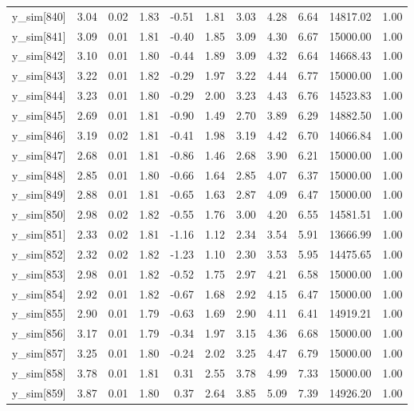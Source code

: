 \begin{table}[ht]
\begin{tabular}{rrrrrrrrrrr}
  y\_sim[840] & 3.04 & 0.02 & 1.83 & -0.51 & 1.81 & 3.03 & 4.28 & 6.64 & 14817.02 & 1.00 \\ 
  y\_sim[841] & 3.09 & 0.01 & 1.81 & -0.40 & 1.85 & 3.09 & 4.30 & 6.67 & 15000.00 & 1.00 \\ 
  y\_sim[842] & 3.10 & 0.01 & 1.80 & -0.44 & 1.89 & 3.09 & 4.32 & 6.64 & 14668.43 & 1.00 \\ 
  y\_sim[843] & 3.22 & 0.01 & 1.82 & -0.29 & 1.97 & 3.22 & 4.44 & 6.77 & 15000.00 & 1.00 \\ 
  y\_sim[844] & 3.23 & 0.01 & 1.80 & -0.29 & 2.00 & 3.23 & 4.43 & 6.76 & 14523.83 & 1.00 \\ 
  y\_sim[845] & 2.69 & 0.01 & 1.81 & -0.90 & 1.49 & 2.70 & 3.89 & 6.29 & 14882.50 & 1.00 \\ 
  y\_sim[846] & 3.19 & 0.02 & 1.81 & -0.41 & 1.98 & 3.19 & 4.42 & 6.70 & 14066.84 & 1.00 \\ 
  y\_sim[847] & 2.68 & 0.01 & 1.81 & -0.86 & 1.46 & 2.68 & 3.90 & 6.21 & 15000.00 & 1.00 \\ 
  y\_sim[848] & 2.85 & 0.01 & 1.80 & -0.66 & 1.64 & 2.85 & 4.07 & 6.37 & 15000.00 & 1.00 \\ 
  y\_sim[849] & 2.88 & 0.01 & 1.81 & -0.65 & 1.63 & 2.87 & 4.09 & 6.47 & 15000.00 & 1.00 \\ 
  y\_sim[850] & 2.98 & 0.02 & 1.82 & -0.55 & 1.76 & 3.00 & 4.20 & 6.55 & 14581.51 & 1.00 \\ 
  y\_sim[851] & 2.33 & 0.02 & 1.81 & -1.16 & 1.12 & 2.34 & 3.54 & 5.91 & 13666.99 & 1.00 \\ 
  y\_sim[852] & 2.32 & 0.02 & 1.82 & -1.23 & 1.10 & 2.30 & 3.53 & 5.95 & 14475.65 & 1.00 \\ 
  y\_sim[853] & 2.98 & 0.01 & 1.82 & -0.52 & 1.75 & 2.97 & 4.21 & 6.58 & 15000.00 & 1.00 \\ 
  y\_sim[854] & 2.92 & 0.01 & 1.82 & -0.67 & 1.68 & 2.92 & 4.15 & 6.47 & 15000.00 & 1.00 \\ 
  y\_sim[855] & 2.90 & 0.01 & 1.79 & -0.63 & 1.69 & 2.90 & 4.11 & 6.41 & 14919.21 & 1.00 \\ 
  y\_sim[856] & 3.17 & 0.01 & 1.79 & -0.34 & 1.97 & 3.15 & 4.36 & 6.68 & 15000.00 & 1.00 \\ 
  y\_sim[857] & 3.25 & 0.01 & 1.80 & -0.24 & 2.02 & 3.25 & 4.47 & 6.79 & 15000.00 & 1.00 \\ 
  y\_sim[858] & 3.78 & 0.01 & 1.81 & 0.31 & 2.55 & 3.78 & 4.99 & 7.33 & 15000.00 & 1.00 \\ 
  y\_sim[859] & 3.87 & 0.01 & 1.80 & 0.37 & 2.64 & 3.85 & 5.09 & 7.39 & 14926.20 & 1.00 \\ 

\end{tabular}
\end{table}
